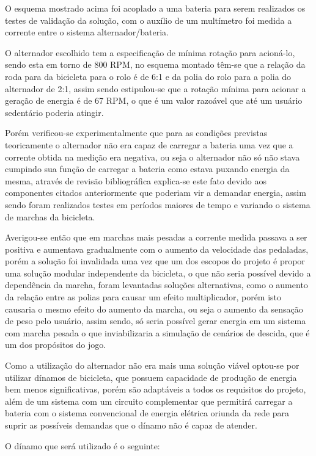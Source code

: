 O esquema mostrado acima foi acoplado a uma bateria para serem realizados os testes de validação da solução, com o auxílio de um multímetro foi medida a corrente entre o sistema alternador/bateria.

O alternador escolhido tem a especificação de mínima rotação para acioná-lo, sendo esta em torno de 800 RPM, no esquema montado têm-se que a relação da roda para da bicicleta para o rolo é de 6:1 e da polia do rolo para a polia do alternador de 2:1, assim sendo estipulou-se que a rotação mínima para acionar a geração de energia é de 67 RPM, o que é um valor razoável que até um usuário sedentário poderia atingir.

Porém verificou-se experimentalmente que para as condições previstas teoricamente o alternador não era capaz de carregar a bateria uma vez que a corrente obtida na medição era negativa, ou seja o alternador não só não stava cumpindo sua função de carregar a bateria como estava puxando energia da mesma, através de revisão bibliográfica explica-se este fato devido aos componentes citados anteriormente que poderiam vir a demandar energia, assim sendo foram realizados testes em períodos maiores de tempo e variando o sistema de marchas da bicicleta.

Averigou-se então que em marchas mais pesadas a corrente medida passava a ser positiva e aumentava gradualmente com o aumento da velocidade das pedaladas, porém a solução foi invalidada uma vez que um dos escopos do projeto é propor uma solução modular independente da bicicleta, o que não seria possível devido a dependência da marcha, foram levantadas soluções alternativas, como o aumento da relação entre as polias para causar um efeito multiplicador, porém isto causaria o mesmo efeito do aumento da marcha, ou seja o aumento da sensação de peso pelo usuário, assim sendo, só seria possível gerar energia em um sistema com marcha pesada o que inviabilizaria a simulação de cenários de descida, que é um dos propósitos do jogo.

Como a utilização do alternador não era mais uma solução viável optou-se por utilizar dínamos de bicicleta, que possuem capacidade de produção de energia bem menos significativas, porém são adaptáveis a todos os requisitos do projeto, além de um sistema com um circuito complementar que permitirá carregar a bateria com o sistema convencional de energia elétrica oriunda da rede para suprir as possíveis demandas que o dínamo não é capaz de atender.

O dínamo que será utilizado é o seguinte:


